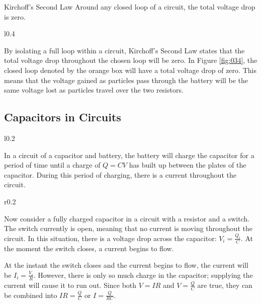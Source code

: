 \documentclass[12pt]{article}
\begin{document}
\begin{definition}{Kirchoff's Second Law}
  Around any closed loop of a circuit, the total voltage drop is zero.
\end{definition}

\begin{wrapfigure}[7]{l}{0.4\textwidth}
  \centering
  
  \caption{}
  \label{fig:034}
\end{wrapfigure}
By isolating a full loop within a circuit, Kirchoff's Second Law states that the total
voltage drop throughout the chosen loop will be zero. In Figure \ref{fig:034}, the closed
loop denoted by the orange box will have a total voltage drop of zero. This means that
the voltage gained as particles pass through the battery will be the same voltage lost as
particles travel over the two resistors.

\newpage
\subsection{Capacitors in Circuits}
\label{ssec:capacitorsInCircuits}

\begin{wrapfigure}[4]{l}{0.2\textwidth}
  \vspace{-20pt}
  \centering
  
\end{wrapfigure}
In a circuit of a capacitor and battery, the battery will charge the capacitor for a period
of time until a charge of $Q=CV$ has built up between the plates of the capacitor. During
this period of charging, there is a current throughout the circuit.
\vspace{12pt}

\begin{wrapfigure}[5]{r}{0.2\textwidth}
  \vspace{-20pt}
  \centering
  
\end{wrapfigure}
Now consider a fully charged capacitor in a circuit with a resistor and a switch. The switch
currently is open, meaning that no current is moving throughout the circuit. In this situation,
there is a voltage drop across the capacitor: $V_{i}=\frac{Q_{i}}{C}$. At the moment the
switch closes, a current begins to flow.
\begin{figure}[H]
  \vspace{-20pt}
  \centering
  
  \vspace{-20pt}
\end{figure}
At the instant the switch closes and the current begins to flow, the current will be
$I_{i}=\frac{V_{i}}{R}$. However, there is only so much charge in the capacitor; supplying
the current will cause it to run out. Since both $V=IR$ and $V=\frac{Q}{C}$ are true, they can be
combined into $IR=\frac{Q}{C}$ or $I=\frac{Q}{RC}$.
\end{document}
